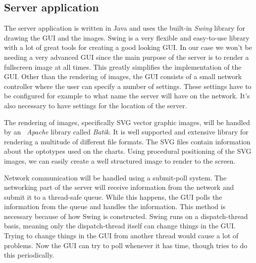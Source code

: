 \documentclass[12pt,a4paper,notitlepage]{report}
\begin{document}
\subsection{Server application}
The server application is written in Java and uses the built-in \textit{Swing} library for drawing the GUI and the images. Swing is a very flexible and easy-to-use library with a lot of great tools for creating a good looking GUI. In our case we won't be needing a very advanced GUI since the main purpose of the server is to render a fullscreen image at all times. This greatly simplifies the implementation of the GUI. Other than the rendering of images, the GUI consists of a small network controller where the user can specify a number of settings. These settings have to be configured for example to what name the server will have on the network. It's also necessary to have settings for the location of the server.

The rendering of images, specifically SVG vector graphic images, will be handled by an \textit{~Apache} library called \textit{Batik}. It is well supported and extensive library for rendering a multitude of different file formats. The SVG files contain information about the optotypes used on the charts. Using procedural positioning of the SVG images, we can easily create a well structured image to render to the screen.


Network communication will be handled using a submit-poll system. The networking part of the server will receive information from the network and submit it to a thread-safe queue. While this happens, the GUI polls the information from the queue and handles the information. This method is necessary because of how Swing is constructed. Swing runs on a dispatch-thread basis, meaning only the dispatch-thread itself can change things in the GUI. Trying to change things in the GUI from another thread would cause a lot of problems. Now the GUI can try to poll whenever it has time, though tries to do this periodically.  
\end{document}

